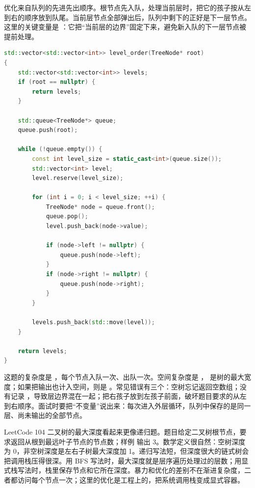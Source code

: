 优化来自队列的先进先出顺序。根节点先入队，处理当前层时，把它的孩子按从左到右的顺序放到队尾。当前层节点全部弹出后，队列中剩下的正好是下一层节点。这里的关键变量是 ：它把“当前层的边界”固定下来，避免新入队的下一层节点被提前处理。

\begin{lstlisting}[language=C++,caption={LeetCode 102 二叉树层序遍历：固定当前层边界}]
std::vector<std::vector<int>> level_order(TreeNode* root)
{
    std::vector<std::vector<int>> levels;
    if (root == nullptr) {
        return levels;
    }

    std::queue<TreeNode*> queue;
    queue.push(root);

    while (!queue.empty()) {
        const int level_size = static_cast<int>(queue.size());
        std::vector<int> level;
        level.reserve(level_size);

        for (int i = 0; i < level_size; ++i) {
            TreeNode* node = queue.front();
            queue.pop();
            level.push_back(node->value);

            if (node->left != nullptr) {
                queue.push(node->left);
            }
            if (node->right != nullptr) {
                queue.push(node->right);
            }
        }

        levels.push_back(std::move(level));
    }

    return levels;
}
\end{lstlisting}

这题的复杂度是 ，每个节点入队一次、出队一次。空间复杂度是 ， 是树的最大宽度；如果把输出也计入空间，则是 。常见错误有三个：空树忘记返回空数组；没有记录 ，导致层边界混在一起；把右孩子放到左孩子前面，破坏题目要求的从左到右顺序。面试时要把“不变量”说出来：每次进入外层循环，队列中保存的是同一层、尚未输出的全部节点。

LeetCode 104 二叉树的最大深度看起来更像递归题。题目给定二叉树根节点，要求返回从根到最远叶子节点的节点数；样例  输出 3。数学定义很自然：空树深度为 0，非空树深度是左右子树最大深度加 1。递归写法短，但深度很大的链式树会把调用栈压得很深。用 BFS 写法时，最大深度就是层序遍历处理过的层数；用显式栈写法时，栈里保存节点和它所在深度。暴力和优化的差别不在渐进复杂度，二者都访问每个节点一次；这里的优化是工程上的，把系统调用栈变成显式容器。


